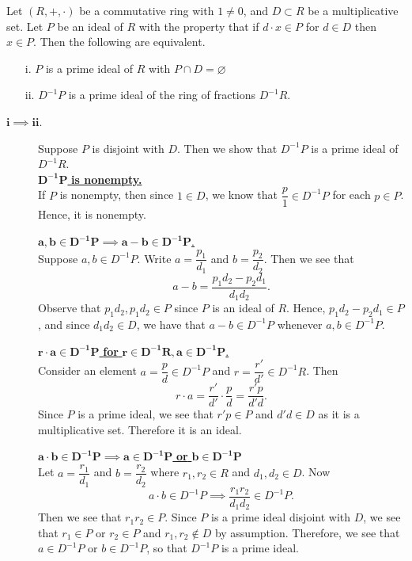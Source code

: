 \begin{thm}
    Let $(R, +, \cdot)$ be a commutative ring with $1 \ne 0$, and $D
    \subset R$ be a multiplicative set. Let $P$ be an ideal of $R$
    with the property that if $d \cdot x \in P$ for $d \in D$ then $x
    \in P$. Then the following are equivalent.
    \begin{itemize}
        \item[i.] $P$ is a prime ideal of $R$ with $P \cap D = \varnothing$
        \item[ii.] $D^{-1}P$ is a prime ideal of the ring of fractions
    $D^{-1}R$.  
    \end{itemize}
\end{thm}

\begin{prf}
    \begin{description}
        \item[$\bm{i \implies ii}$.]
        Suppose $P$ is disjoint with $D$. Then we show that $D^{-1}P$
        is a prime ideal of $D^{-1}R$.\\
        \noindent\underline{$\bm{D^{-1}P}$\textbf{ is nonempty.}}\\[1.2ex]
        If $P$ is nonempty, then since $1 \in D$, we know that
        $\dfrac{p}{1} \in D^{-1}P$ for each $p \in P$. Hence, it is nonempty.

        \noindent\underline{$\bm{a, b \in D^{-1}P \implies a - b \in D^{-1}P}$.}\\[1.2ex]
        Suppose $a, b \in D^{-1}P$. Write $a = \dfrac{p_1}{d_1}$ and
        $b = \dfrac{p_2}{d_2}$. Then we see that 
        \[
            a - b = \frac{p_1d_2 - p_2d_1}{d_1d_2}.
        \] 
        Observe that $p_1d_2, p_1d_2 \in P$ since $P$ is an ideal of
        $R$. Hence, $p_1d_2 - p_2d_1 \in P$, and since $d_1d_2 \in D$,
        we have that $a - b \in D^{-1}P$ whenever $a, b \in D^{-1}P$.

        \noindent\underline{$\bm{r\cdot a \in D^{-1}P}$ \textbf{ for }
        $\bm{r \in  D^{-1}R, a \in D^{-1}P}$.}\\[1.2ex]
        Consider an element $a = \dfrac{p}{d} \in
        D^{-1}{P}$ and $r = \dfrac{r'}{d'} \in D^{-1}R$. Then 
        \[
            r \cdot a = \frac{r'}{d'} \cdot \frac{p}{d} = \frac{r'p}{d'd}.
        \]
        Since $P$ is a prime ideal, we see that $r'p \in P$ and $d'd
        \in D$ as it is a multiplicative set. Therefore it is an
        ideal. 

        \noindent\underline{$\bm{a\cdot b \in D^{-1}P \implies a \in D^{-1}P}$
        \textbf{or} $\bm{b \in D^{-1}P}$} \\[1.2ex]
        Let $a = \dfrac{r_1}{d_1}$ and $b = \dfrac{r_2}{d_2}$ where
        $r_1,r_2 \in R$ and $d_1,d_2 \in D$. Now 
        \[
            a \cdot b \in D^{-1}P \implies \frac{r_1r_2}{d_1d_2} \in D^{-1}P.
        \] 
        Then we see that $r_1r_2 \in P.$ Since $P$ is a prime ideal
        disjoint with $D$, we see that $r_1 \in P$ or $r_2 \in P$ and
        $r_1,r_2 \not\in D$ by assumption. Therefore, we see that $a
        \in D^{-1}P$ or $b \in D^{-1}P$, so that $D^{-1}P$ is a prime
        ideal. 


\end{description}
\end{prf}
